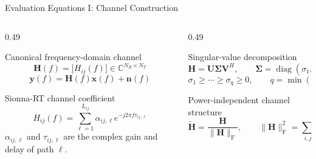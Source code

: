 
\begin{frame}[t]{Evaluation Equations I: Channel Construction}
  \footnotesize
  \begin{columns}[T,onlytextwidth]
    \begin{column}{0.49\textwidth}
      \begin{block}{Canonical frequency-domain channel}
        \begin{equation*}
          \mathbf H(f)=\bigl[H_{ij}(f)\bigr]
          \in\mathbb C^{N_R\times N_T}
        \end{equation*}
        \vspace{-1.5ex}
        \begin{equation*}
          \mathbf y(f)=\mathbf H(f)\mathbf x(f)+\mathbf n(f)
        \end{equation*}
      \end{block}

      \begin{block}{Sionna-RT channel coefficient}
        \begin{equation*}
          H_{ij}(f)=\sum_{\ell=1}^{L_{ij}}
          \alpha_{ij,\ell}e^{-j2\pi f\tau_{ij,\ell}}
        \end{equation*}
        \scriptsize $\alpha_{ij,\ell}$ and $\tau_{ij,\ell}$ are the complex
        gain and delay of path $\ell$.
      \end{block}
    \end{column}

    \begin{column}{0.49\textwidth}
      \begin{block}{Singular-value decomposition}
        \begin{equation*}
          \mathbf H=\mathbf U\boldsymbol\Sigma\mathbf V^{H},\qquad
          \boldsymbol\Sigma=\operatorname{diag}(\sigma_1,\ldots,\sigma_q)
        \end{equation*}
        \vspace{-1ex}
        \begin{equation*}
          \sigma_1\geq\cdots\geq\sigma_q\geq0,\qquad
          q=\min(N_R,N_T)
        \end{equation*}
      \end{block}

      \begin{block}{Power-independent channel structure}
        \begin{equation*}
          \widetilde{\mathbf H}
          =\frac{\mathbf H}{\lVert\mathbf H\rVert_{\mathrm F}},\qquad
          \lVert\mathbf H\rVert_{\mathrm F}^{2}
          =\sum_{i,j}|H_{ij}|^2
        \end{equation*}
      \end{block}
    \end{column}
  \end{columns}


\end{frame}
